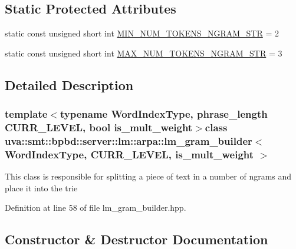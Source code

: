\subsection*{Static Protected Attributes}
\begin{DoxyCompactItemize}
\item 
static const unsigned short int \hyperlink{classuva_1_1smt_1_1bpbd_1_1server_1_1lm_1_1arpa_1_1lm__gram__builder_a42dd135ed8cb085d3fbd417a8bb45d1d}{M\+I\+N\+\_\+\+N\+U\+M\+\_\+\+T\+O\+K\+E\+N\+S\+\_\+\+N\+G\+R\+A\+M\+\_\+\+S\+T\+R} = 2
\item 
static const unsigned short int \hyperlink{classuva_1_1smt_1_1bpbd_1_1server_1_1lm_1_1arpa_1_1lm__gram__builder_a91ab45c8eefff09895b9d75d9848cab8}{M\+A\+X\+\_\+\+N\+U\+M\+\_\+\+T\+O\+K\+E\+N\+S\+\_\+\+N\+G\+R\+A\+M\+\_\+\+S\+T\+R} = 3
\end{DoxyCompactItemize}


\subsection{Detailed Description}
\subsubsection*{template$<$typename Word\+Index\+Type, phrase\+\_\+length C\+U\+R\+R\+\_\+\+L\+E\+V\+E\+L, bool is\+\_\+mult\+\_\+weight$>$class uva\+::smt\+::bpbd\+::server\+::lm\+::arpa\+::lm\+\_\+gram\+\_\+builder$<$ Word\+Index\+Type, C\+U\+R\+R\+\_\+\+L\+E\+V\+E\+L, is\+\_\+mult\+\_\+weight $>$}

This class is responsible for splitting a piece of text in a number of ngrams and place it into the trie 

Definition at line 58 of file lm\+\_\+gram\+\_\+builder.\+hpp.



\subsection{Constructor \& Destructor Documentation}
\hypertarget{classuva_1_1smt_1_1bpbd_1_1server_1_1lm_1_1arpa_1_1lm__gram__builder_aa5dc99da59bfc3886691c8a6257795d5}{}

